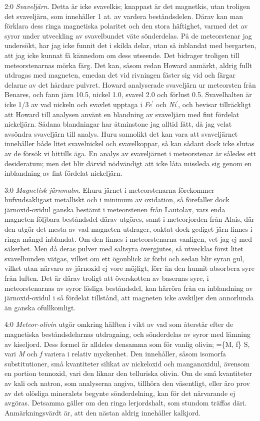 \documentclass[a4paper, 12pt, oneside, swedish]{article}
\begin{document}
2:0 \emph{Svaveljärn}. Detta är icke svavelkis; knappast är det magnetkis, utan troligen det svaveljärn, som innehåller 1 at. av vardera beståndsdelen. Därav kan man förklara dess ringa magnetiska polaritet och den stora häftighet, varmed det av syror under utveckling av svavelbundet väte sönderdelas. På de meteorstenar jag undersökt, har jag icke funnit det i skilda delar, utan så inblandat med bergarten, att jag icke kunnat få kännedom om dess utseende. Det bidrager troligen till meteorstenarnas mörka färg. Det kan, såsom redan Howard anmärkt, aldrig fullt utdragas med magneten, emedan det vid rivningen fäster sig vid och färgar delarne av det hårdare pulvret. Howard analyserade svaveljärn ur meteorsten från Benares, och fann järn 10.5, nickel 1.0, svavel 2.0 och förlust 0.5. Svavelhalten är icke 1/3 av vad nickeln och svavlet upptaga i \emph{Fe}$^{\prime}$ och \emph{Ni}$^{\prime}$, och bevisar tillräckligt att Howard till analysen använt en blandning av svaveljärn med fint fördelat nickeljärn. Sådana blandningar har åtminstone jag alltid fått, då jag velat avsöndra svaveljärn till analys. Huru sannolikt det kan vara att svaveljärnet innehåller både litet svavelnickel och svavelkoppar, så kan sådant dock icke slutas av de försök vi hittills äga. En analys av svaveljärnet i meteorstenar är således ett desideratum; men det blir därvid nödvändigt att icke låta missleda sig genom en inblandning av fint fördelat nickeljärn.

3:0 \emph{Magnetisk järnmalm}. Ehuru järnet i meteorstenarna förekommer hufvudsakligast metalliskt och i minimum av oxidation, så förefaller dock järnoxid-oxidul ganska bestämt i meteorstenen från Lautolax, vars enda magneten följbara beståndsdel därav utgöres, samt i meteorjorden från Alais, där den utgör det mesta av vad magneten utdrager, oaktat dock gediget järn finnes i ringa mängd inblandat. Om den finnes i meteorstenarna vanligen, vet jag ej med säkerhet. Men då deras pulver med saltsyra övergjutes, så utvecklas först litet svavelbunden vätgas, vilket om ett ögonblick är förbi och sedan blir syran gul, vilket utan närvaro av järnoxid ej vore möjligt, förr än den hunnit absorbera syre från luften. Det är därav troligt att överskotten av basernas syre, i meteorstenarnas av syror lösliga beståndsdel, kan härröra från en inblandning av järnoxid-oxidul i så fördelat tillstånd, att magneten icke avskiljer den annorlunda än ganska ofullkomligt.

4:0 \emph{Meteor-olivin} utgör omkring hälften i vikt av vad som återstår efter de magnetiska beståndsdelarnas utdragning, och sönderdelas av syror med lämning av kiseljord. Dess formel är alldeles densamma som för vanlig olivin; =\{M, ƒ\} S, vari \emph{M} och \emph{ƒ} variera i relativ myckenhet. Den innehåller, såsom isomorfa substitutioner, små kvantiteter silikat av nickeloxid och manganoxidul, ävensom en portion tennoxid, vari den liknar den telluriska olivin. Om de små kvantiteter av kali och natron, som analyserna angiva, tillhöra den väsentligt, eller äro prov av det olösliga mineralets begynte sönderdelning, kan för det närvarande ej avgöras. Detsamma gäller om den ringa lerjordshalt, som stundom träffas däri. Anmärkningsvärdt är, att den nästan aldrig innehåller kalkjord.
\end{document}
